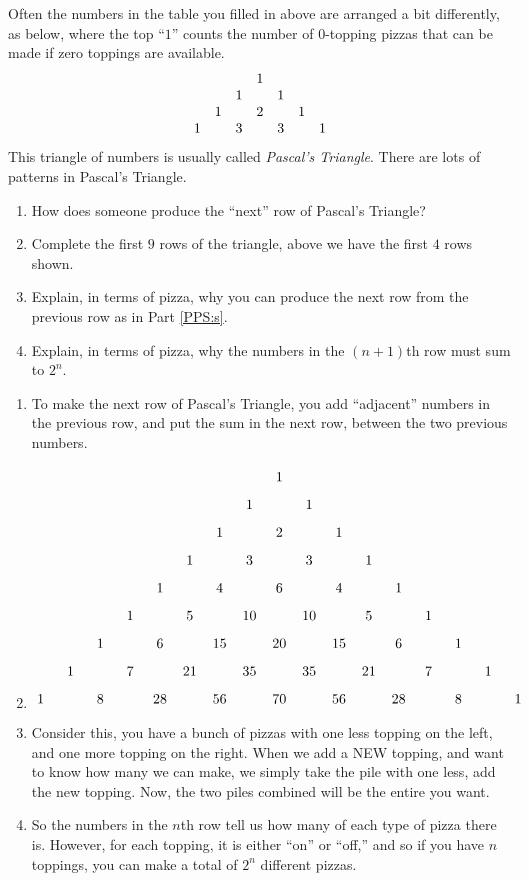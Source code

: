 \documentclass[noauthor,nooutcomes,hints,handout]{ximera}
\begin{document}
\begin{question}
  Often the numbers in the table you filled in above are arranged a
  bit differently, as below, where the top ``$1$'' counts the number
  of $0$-topping pizzas that can be made if zero toppings are
  available.
  \[
  \begin{array}{c c c c c c c}
    &   &   & 1 &   &   &  \\
    &   & 1 &   & 1 &   &  \\
    & 1 &   & 2 &   & 1 &  \\
    1 &   & 3 &   & 3 &   & 1
  \end{array}
  \]
This triangle of numbers is usually called \textit{Pascal's
  Triangle}. There are lots of patterns in
Pascal's Triangle.
\begin{enumerate}
  \item\label{PPS:s} How does someone produce the ``next'' row of Pascal's
    Triangle? 
  \item Complete the first $9$ rows of the triangle, above we have the
    first $4$ rows shown.
  \item Explain, in terms of pizza, why you can produce the next row
    from the previous row as in Part \ref{PPS:s}.
  \item Explain, in terms of pizza, why the numbers in the $(n+1)$th row
    must sum to $2^n$.
\end{enumerate}
\begin{freeResponse}
  \begin{enumerate}
  \item To make the next row of Pascal's Triangle, you add
    ``adjacent'' numbers in the previous row, and put the sum in the
    next row, between the two previous numbers.
  \item
    \[%
    \begin{tikzpicture}
      \foreach \n in {0,...,8} {
        \foreach \k in {0,...,\n} {
          \node at ({1.5*(\k-\n/2)},-\n*.7) {\binomialCoefficient{\n}{\k}};
        }
      }
    \end{tikzpicture}
    \]
  \item Consider this, you have a bunch of pizzas with one less
    topping on the left, and one more topping on the right. When we
    add a NEW topping, and want to know how many we can make, we
    simply take the pile with one less, add the new topping.  Now, the
    two piles combined will be the entire you want.
  \item So the numbers in the $n$th row tell us how many of each type
    of pizza there is. However, for each topping, it is either ``on''
    or ``off,'' and so if you have $n$ toppings, you can make a total
    of $2^n$ different pizzas.
  \end{enumerate}
\end{freeResponse}
\end{question}
\end{document}
